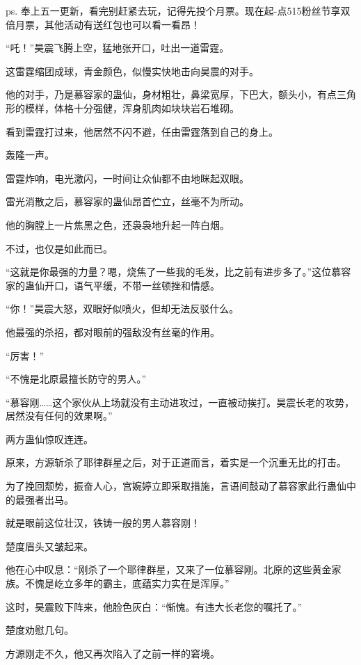 
\begin{this_body}

ps. 奉上五一更新，看完别赶紧去玩，记得先投个月票。现在起-点515粉丝节享双倍月票，其他活动有送红包也可以看一看昂！

“吒！”昊震飞腾上空，猛地张开口，吐出一道雷霆。

这雷霆缩团成球，青金颜色，似慢实快地击向昊震的对手。

他的对手，乃是慕容家的蛊仙，身材粗壮，鼻梁宽厚，下巴大，额头小，有点三角形的模样，体格十分强健，浑身肌肉如块块岩石堆砌。

看到雷霆打过来，他居然不闪不避，任由雷霆落到自己的身上。

轰隆一声。

雷霆炸响，电光激闪，一时间让众仙都不由地眯起双眼。

雷光消散之后，慕容家的蛊仙昂首伫立，丝毫不为所动。

他的胸膛上一片焦黑之色，还袅袅地升起一阵白烟。

不过，也仅是如此而已。

“这就是你最强的力量？嗯，烧焦了一些我的毛发，比之前有进步多了。”这位慕容家的蛊仙开口，语气平缓，不带一丝顿挫和情感。

“你！”昊震大怒，双眼好似喷火，但却无法反驳什么。

他最强的杀招，都对眼前的强敌没有丝毫的作用。

“厉害！”

“不愧是北原最擅长防守的男人。”

“慕容刚……这个家伙从上场就没有主动进攻过，一直被动挨打。昊震长老的攻势，居然没有任何的效果啊。”

两方蛊仙惊叹连连。

原来，方源斩杀了耶律群星之后，对于正道而言，着实是一个沉重无比的打击。

为了挽回颓势，振奋人心，宫婉婷立即采取措施，言语间鼓动了慕容家此行蛊仙中的最强者出马。

就是眼前这位壮汉，铁铸一般的男人慕容刚！

楚度眉头又皱起来。

他在心中叹息：“刚杀了一个耶律群星，又来了一位慕容刚。北原的这些黄金家族。不愧是屹立多年的霸主，底蕴实力实在是浑厚。”

这时，昊震败下阵来，他脸色灰白：“惭愧。有违大长老您的嘱托了。”

楚度劝慰几句。

方源刚走不久，他又再次陷入了之前一样的窘境。


\end{this_body}
